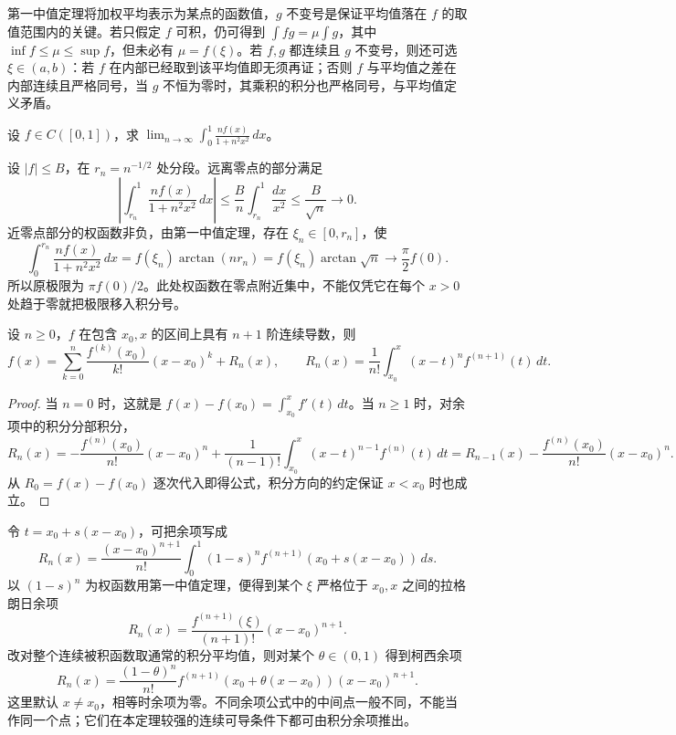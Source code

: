 \documentclass[UTF8,12pt,a4paper,fontset=fandol]{ctexbook}
\begin{document}
第一中值定理将加权平均表示为某点的函数值，$g$ 不变号是保证平均值落在 $f$ 的取值范围内的关键。若只假定 $f$ 可积，仍可得到 $\int fg=\mu\int g$，其中 $\inf f\leq\mu\leq\sup f$，但未必有 $\mu=f(\xi)$。若 $f,g$ 都连续且 $g$ 不变号，则还可选 $\xi\in(a,b)$：若 $f$ 在内部已经取到该平均值即无须再证；否则 $f$ 与平均值之差在内部连续且严格同号，当 $g$ 不恒为零时，其乘积的积分也严格同号，与平均值定义矛盾。

\begin{example}
\label{ex:concentrating-integral-kernel}
设 $f\in C([0,1])$，求 $\displaystyle\lim_{n\to\infty}\int_0^1\frac{nf(x)}{1+n^2x^2}\,dx$。
\end{example}
\begin{solve}
设 $|f|\leq B$，在 $r_n=n^{-1/2}$ 处分段。远离零点的部分满足
\[
    \left|\int_{r_n}^1\frac{nf(x)}{1+n^2x^2}\,dx\right|
    \leq\frac Bn\int_{r_n}^1\frac{dx}{x^2}
    \leq\frac B{\sqrt n}\longrightarrow0.
\]
近零点部分的权函数非负，由第一中值定理，存在 $\xi_n\in[0,r_n]$，使
\[
    \int_0^{r_n}\frac{nf(x)}{1+n^2x^2}\,dx
    =f(\xi_n)\arctan(nr_n)
    =f(\xi_n)\arctan\sqrt n
    \longrightarrow\frac{\pi}{2}f(0).
\]
所以原极限为 $\pi f(0)/2$。此处权函数在零点附近集中，不能仅凭它在每个 $x>0$ 处趋于零就把极限移入积分号。
\end{solve}

\begin{theorem}[带积分余项的泰勒公式]
\label{thm:taylor-integral-remainder}
设 $n\geq0$，$f$ 在包含 $x_0,x$ 的区间上具有 $n+1$ 阶连续导数，则
\begin{equation}
    f(x)=\sum_{k=0}^n\frac{f^{(k)}(x_0)}{k!}(x-x_0)^k+R_n(x),
    \qquad
    R_n(x)=\frac1{n!}\int_{x_0}^x(x-t)^n f^{(n+1)}(t)\,dt.
    \label{eq:taylor-integral-remainder}
\end{equation}
\end{theorem}
\begin{proof}
当 $n=0$ 时，这就是 $f(x)-f(x_0)=\int_{x_0}^x f'(t)\,dt$。当 $n\geq1$ 时，对余项中的积分分部积分，
\[
    R_n(x)
    =-\frac{f^{(n)}(x_0)}{n!}(x-x_0)^n
      +\frac1{(n-1)!}\int_{x_0}^x(x-t)^{n-1}f^{(n)}(t)\,dt
    =R_{n-1}(x)-\frac{f^{(n)}(x_0)}{n!}(x-x_0)^n.
\]
从 $R_0=f(x)-f(x_0)$ 逐次代入即得公式，积分方向的约定保证 $x<x_0$ 时也成立。
\end{proof}

令 $t=x_0+s(x-x_0)$，可把余项写成
\[
    R_n(x)=\frac{(x-x_0)^{n+1}}{n!}
    \int_0^1(1-s)^n f^{(n+1)}(x_0+s(x-x_0))\,ds.
\]
以 $(1-s)^n$ 为权函数用第一中值定理，便得到某个 $\xi$ 严格位于 $x_0,x$ 之间的拉格朗日余项
\[
    R_n(x)=\frac{f^{(n+1)}(\xi)}{(n+1)!}(x-x_0)^{n+1}.
\]
改对整个连续被积函数取通常的积分平均值，则对某个 $\theta\in(0,1)$ 得到柯西余项
\[
    R_n(x)=\frac{(1-\theta)^n}{n!}
    f^{(n+1)}(x_0+\theta(x-x_0))(x-x_0)^{n+1}.
\]
这里默认 $x\neq x_0$，相等时余项为零。不同余项公式中的中间点一般不同，不能当作同一个点；它们在本定理较强的连续可导条件下都可由积分余项推出。
\end{document}
